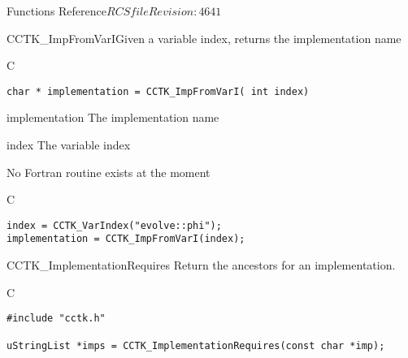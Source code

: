 \begin{cactuspart}{ Functions Reference}{$RCSfile$}{$Revision: 4641 $}



\begin{FunctionDescription}{CCTK\_ImpFromVarI}{Given a variable index, returns the implementation name}
\label{CCTK-ImpFromVarI}
\begin{SynopsisSection}
\begin{Synopsis}{C}
\begin{verbatim}char * implementation = CCTK_ImpFromVarI( int index)\end{verbatim}
\end{Synopsis}
\end{SynopsisSection}
\begin{ParameterSection}
\begin{Parameter}{implementation}
The implementation name
\end{Parameter}
\begin{Parameter}{index}
The variable index
\end{Parameter}
\end{ParameterSection}
\begin{Discussion}
No Fortran routine exists at the moment
\end{Discussion}
\begin{ExampleSection}
\begin{Example}{C}
\begin{verbatim}
index = CCTK_VarIndex("evolve::phi");
implementation = CCTK_ImpFromVarI(index);
\end{verbatim}
\end{Example}
\end{ExampleSection}
\end{FunctionDescription}



\begin{FunctionDescription}{CCTK\_ImplementationRequires}
\label{CCTK-ImplementationRequires}
Return the ancestors for an implementation.

\begin{SynopsisSection}
\begin{Synopsis}{C}
\begin{verbatim}
#include "cctk.h"

uStringList *imps = CCTK_ImplementationRequires(const char *imp);
\end{verbatim}
\end{Synopsis}
\end{SynopsisSection}


\end{FunctionDescription}
\end{cactuspart}
